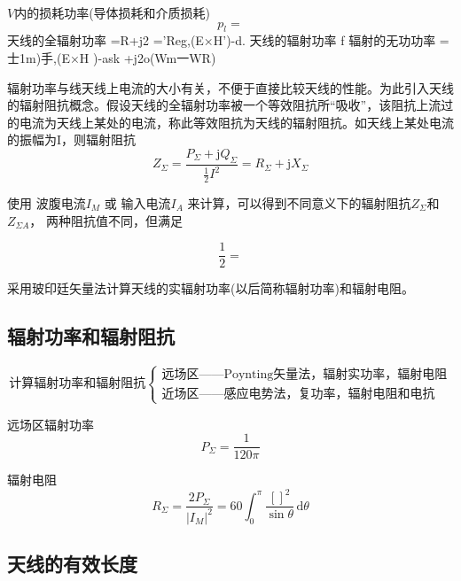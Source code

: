     $V$内的损耗功率(导体损耗和介质损耗)
    \begin{equation}
        p_l=
    \end{equation}
天线的全辐射功率
=R+j2
='Reg,(E×H')-d.
天线的辐射功率
f
辐射的无功功率
=士1m)手,(E×H )-ask
+j2o(Wm一WR)


    辐射功率与线天线上电流的大小有关，不便于直接比较天线的性能。为此引入天线的辐射阻抗概念。假设天线的全辐射功率被一个等效阻抗所“吸收”，该阻抗上流过的电流为天线上某处的电流，称此等效阻抗为天线的辐射阻抗。如天线上某处电流的振幅为I，则辐射阻抗
    \begin{equation}
        Z_\Sigma=\frac{P_\Sigma+\mathrm{j}Q_\Sigma}{\frac{1}{2}I^2}=R_\Sigma+\mathrm{j}X_\Sigma
    \end{equation}

    使用 波腹电流$I_M$ 或 输入电流$I_A$ 来计算，可以得到不同意义下的辐射阻抗$Z_\Sigma$和$Z_{\Sigma A}$，
    两种阻抗值不同，但满足
    
    \begin{equation}
        \frac{1}{2}=
    \end{equation}

    采用玻印廷矢量法计算天线的实辐射功率(以后简称辐射功率)和辐射电阻。

    \subsection{辐射功率和辐射阻抗}

    \begin{equation*}
    \mbox{计算辐射功率和辐射阻抗}
    \begin{cases}
        \mbox{远场区——Poynting矢量法，辐射实功率，辐射电阻}\\
        \mbox{近场区——感应电势法，复功率，辐射电阻和电抗}
    \end{cases}
    \end{equation*}

    远场区辐射功率
    \begin{equation}
        P_\Sigma=\frac{1}{120\pi}
    \end{equation}

    辐射电阻
    \begin{equation}
        R_\Sigma=\frac{2P_\Sigma}{|I_M|^2}=60 \int_{0}^{\pi}\frac{[]^2}{\sin\theta}\,\mathrm{d}\theta
    \end{equation}

    \subsection{天线的有效长度}
